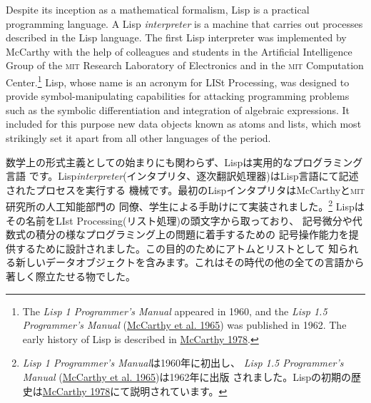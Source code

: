 \documentclass[8pt,oneside]{book}
\newcommand{\acronym}[1]{\textsc{\MakeLowercase{#1}}}
\newcommand{\newterm}[1]{\index{#1}\emph{#1}}
\newcommand{\link}[1]{\hyperref[#1]{#1}}
\begin{document}
Despite its inception as a mathematical formalism, Lisp is a practical
programming language.  A Lisp \newterm{interpreter} is a machine that carries
out processes described in the Lisp language.  The first Lisp interpreter was
implemented by McCarthy with the help of colleagues and students in the
Artificial Intelligence Group of the \acronym{MIT} Research Laboratory of
Electronics and in the \acronym{MIT} Computation Center.\footnote{The
\textit{Lisp 1 Programmer's Manual} appeared in 1960, and the \textit{Lisp 1.5
Programmer's Manual} (\link{McCarthy et al. 1965}) was published in 1962.  The early history
of Lisp is described in \link{McCarthy 1978}.}  Lisp, whose name is an acronym for
LISt Processing, was designed to provide symbol-manipulating capabilities for
attacking programming problems such as the symbolic differentiation and
integration of algebraic expressions.  It included for this purpose new data
objects known as atoms and lists, which most strikingly set it apart from all
other languages of the period.

数学上の形式主義としての始まりにも関わらず、Lispは実用的なプログラミング言語
です。Lisp\newterm{interpreter}(インタプリタ、逐次翻訳処理器)はLisp言語にて記述されたプロセスを実行する
機械です。最初のLispインタプリタはMcCarthyと\acronym{MIT}研究所の人工知能部門の
同僚、学生による手助けにて実装されました。\footnote{
\textit{Lisp 1 Programmer's Manual}は1960年に初出し、
\textit{Lisp 1.5 Programmer's Manual} (\link{McCarthy et al. 1965})は1962年に出版
されました。Lispの初期の歴史は\link{McCarthy 1978}にて説明されています。}
Lispはその名前をLIst Processing(リスト処理)の頭文字から取っており、
記号微分や代数式の積分の様なプログラミング上の問題に着手するための
記号操作能力を提供するために設計されました。この目的のためにアトムとリストとして
知られる新しいデータオブジェクトを含みます。これはその時代の他の全ての言語から
著しく際立たせる物でした。
\end{document}
